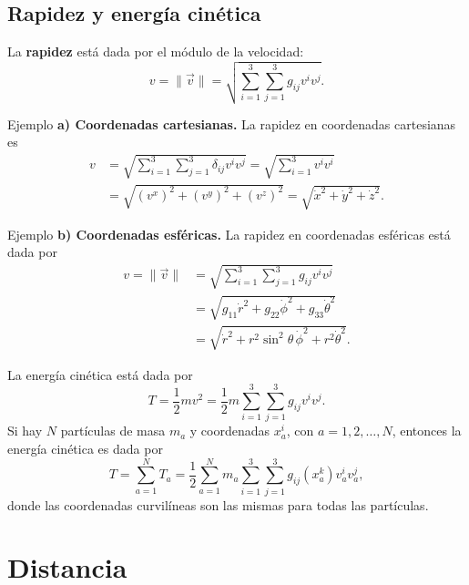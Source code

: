 \documentclass[../apunte_mecanica_clasica.tex]{subfiles}%
\begin{document}
\subsection{Rapidez y energía cinética}

La \textbf{rapidez} está dada por el módulo de la velocidad:
\begin{equation}
    v=\|\vec v\|=\sqrt{\sum_{i=1}^{3}\sum_{j=1}^{3}g_{ij}v^i v^j}.
    \label{eq:mecanica-rapidez-general}
\end{equation}

\begin{apuntebloque}{Ejemplo}
\textbf{a) Coordenadas cartesianas.} La rapidez en coordenadas cartesianas es
\begin{align*}
    v
    &=\sqrt{\sum_{i=1}^{3}\sum_{j=1}^{3}\delta_{ij}v^i v^j}
      =\sqrt{\sum_{i=1}^{3}v^i v^i} \\
    &=\sqrt{(v^x)^2+(v^y)^2+(v^z)^2}
      =\sqrt{\dot x^2+\dot y^2+\dot z^2}.
\end{align*}
\end{apuntebloque}

\begin{apuntebloque}{Ejemplo}
\textbf{b) Coordenadas esféricas.} La rapidez en coordenadas esféricas está dada por
\begin{align*}
    v=\|\vec v\|
    &=\sqrt{\sum_{i=1}^{3}\sum_{j=1}^{3}g_{ij}v^i v^j} \\
    &=\sqrt{g_{11}\dot r^2+g_{22}\dot\phi^2+g_{33}\dot\theta^2} \\
    &=\sqrt{\dot r^2+r^2\sin^2\theta\,\dot\phi^2+r^2\dot\theta^2}.
\end{align*}
\end{apuntebloque}

La energía cinética está dada por
\begin{equation*}
    T=\frac{1}{2}mv^2=\frac{1}{2}m\sum_{i=1}^{3}\sum_{j=1}^{3}g_{ij}v^i v^j.
\end{equation*}
Si hay $N$ partículas de masa $m_a$ y coordenadas $x^i_a$, con $a=1,2,\ldots,N$, entonces la energía cinética es dada por
\begin{equation*}
    T=\sum_{a=1}^{N}T_a
    =\frac{1}{2}\sum_{a=1}^{N}m_a
    \sum_{i=1}^{3}\sum_{j=1}^{3}g_{ij}(x^k_a)v^i_a v^j_a,
\end{equation*}
donde las coordenadas curvilíneas son las mismas para todas las partículas.

\newpage
\section{Distancia}
\end{document}

